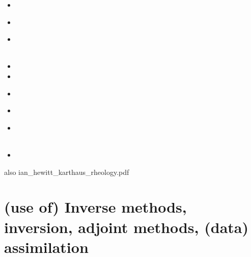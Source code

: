\begin{small}
\begin{itemize}
 \\
\item[\twothousandseventeen] 
 \\
\item[\twothousandeighteen] 
 \\
\item[\twothousandnineteen] 
 \\
 \\
\item[\twothousandtwenty] 
\item[\twothousandtwentyone] 
\item[\twothousandtwentytwo]
 \\ 
\item[\twothousandtwentythree]
 \\
\item[\twothousandtwentyfour]
 \\
 \\
\item[\twothousandtwentyfive]
\end{itemize}
\end{small}


also ian\_hewitt\_karthaus\_rheology.pdf


\section{(use of) Inverse methods, inversion, adjoint methods, (data) assimilation}

